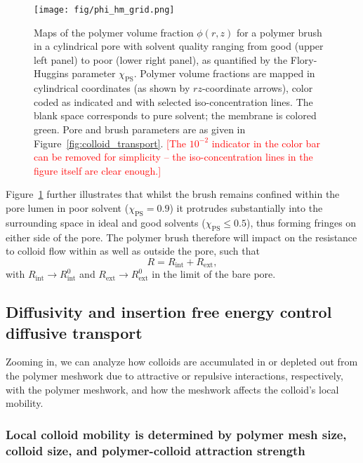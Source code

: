\documentclass[12pt, a4paper]{article}
\newcommand\todo[1]{\textcolor{red}{#1}}
\begin{document}
\begin{figure}
    \centering
    \texttt{[image: fig/phi\_hm\_grid.png]}
    \caption{
    Maps of the polymer volume fraction $\phi(r,z)$ for a polymer brush in a cylindrical pore with solvent quality ranging from good (upper left panel) to poor (lower right panel), as quantified by the Flory-Huggins parameter $\chi_{\text{PS}}$.
    Polymer volume fractions are mapped in cylindrical coordinates (as shown by $rz$-coordinate arrows), color coded as indicated and with selected iso-concentration lines. The blank space corresponds to pure solvent; the membrane is colored green.
    Pore and brush parameters are as given in Figure~\ref{fig:colloid_transport}.
    \todo{[The $10^{-2}$ indicator in the color bar can be removed for simplicity -- the iso-concentration lines in the figure itself are clear enough.]}
    }
    \label{fig:phi_hm_grid}
\end{figure}

Figure~\ref{fig:phi_hm_grid} further illustrates that whilst the brush remains confined within the pore lumen in poor solvent ($\chi_{\text{PS}}=0.9$) it protrudes substantially into the surrounding space in ideal and good solvents ($\chi_{\text{PS}}\le0.5$), thus forming fringes on either side of the pore.
The polymer brush therefore will impact on the resistance to colloid flow within as well as outside the pore, such that
\begin{equation}
    R=R_{\text{int}}+R_{\text{ext}},
    \label{eq:R_tot_tot}
\end{equation}
with $R_{\text{int}}\rightarrow R_{\text{int}}^{0}$ and $R_{\text{ext}}\rightarrow R_{\text{ext}}^{0}$ in the limit of the bare pore.


\subsection{Diffusivity and insertion free energy control diffusive transport}

Zooming in, we can analyze how colloids are accumulated in or depleted out from the polymer meshwork due to attractive or repulsive interactions, respectively, with the polymer meshwork, and how the meshwork affects the colloid's local mobility.

\subsubsection{Local colloid mobility is determined by polymer mesh size, colloid size, and polymer-colloid attraction strength}
\end{document}
